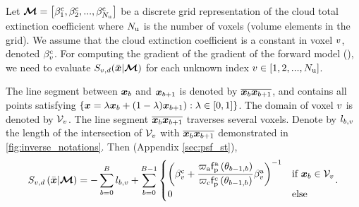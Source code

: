 \documentclass{article}
\begin{document}
Let $\boldsymbol{\mathcal{M}}=\left[{\beta^{\text{c}}_1, \beta^{\text{c}}_2,...,\beta^{\text{c}}_{N_{\text{u}}}}\right]$ be a discrete grid representation of the cloud total extinction coefficient where $N_{\text{u}}$ is the number of voxels (volume elements in the grid). We assume that the cloud extinction coefficient is a constant in voxel $v$, denoted $\beta^{\text{c}}_v$. For computing the gradient of the gradient of the forward model (\eqnopar{\ref{eq:int_derivative_full}}), we need to evaluate $S_{v,d}(\Bar{\boldsymbol{x}}|\boldsymbol{\mathcal{M}})$ for each  unknown index $v \in \left[{1,2,...,N_{\text{u}}}\right]$.

The line segment between $\boldsymbol{x}_{b}$ and $\boldsymbol{x}_{b+1}$ is denoted by $\overline{{\boldsymbol{x}_{b}}{\boldsymbol{x}_{b+1}}}$, and contains all
points satisfying $\left\{ {\boldsymbol{x}=\lambda \boldsymbol{x}_{b}+(1-\lambda )\boldsymbol{x}_{b+1}):\lambda \in\left[{0,1}\right]}\right\}$. The domain of voxel $v$ is denoted by $\mathcal{V}_{v}$. The line segment $\overline{{\boldsymbol{x}_{b}}{\boldsymbol{x}_{b+1}}}$ traverses
several voxels. Denote by $l_{b,v}$ the length of the intersection of $\mathcal{V}_{v}$ with $\overline{{\boldsymbol{x}_{b}}{\boldsymbol{x}_{b+1}}}$ demonstrated in \fig\ref{fig:inverse_notations}. Then (Appendix \ref{sec:psf_st}),
\begin{equation}
S_{v, d}\left({\Bar{\boldsymbol{x}}|\boldsymbol{\mathcal{M}}}\right) = -\sum_{b=0}^{B}{l_{b,v}}+
\sum_{b=0}^{B-1}{
\begin{cases}
\left({\beta^{\text{c}}_{v}+\dfrac{\varpi_{\text{a}}\mathsf{f}_{\text{p}}^{\text{a}}\left({\theta_{b-1,b}}\right)}{\varpi_{\text{c}}\mathsf{f}_{\text{p}}^{\text{c}}\left({\theta_{b-1,b}}\right)}\beta^{\text{a}}_{v}}\right) ^ {-1} & \text{if $\boldsymbol{x}_{b}\in\mathcal{V}_{v}$} \\
0 & \text{else}
\end{cases}}.
\end{equation}

\end{document}
